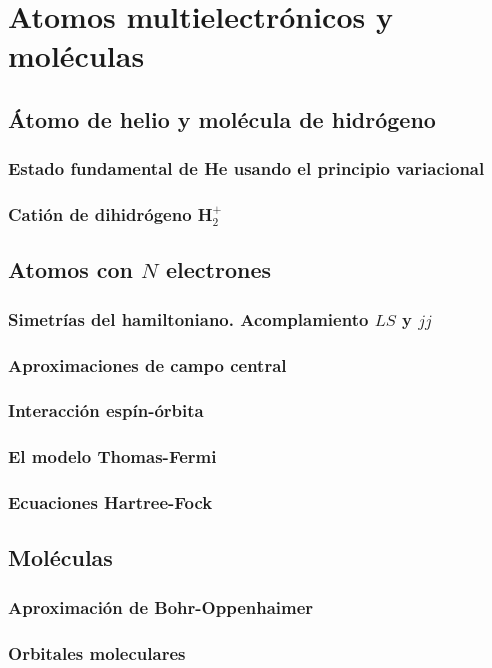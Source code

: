 \chapter{Atomos multielectrónicos y moléculas}

\section{Átomo de helio y molécula de hidrógeno}

\subsection{Estado fundamental de He usando el principio variacional}

\subsection{Catión de dihidrógeno H$_2^+$}

\section{Atomos con $N$ electrones}

\subsection{Simetrías del hamiltoniano. Acomplamiento $LS$ y $jj$}

\subsection{Aproximaciones de campo central}

\subsection{Interacción espín-órbita}

\subsection{El modelo Thomas-Fermi}

\subsection{Ecuaciones Hartree-Fock}

\section{Moléculas}

\subsection{Aproximación de Bohr-Oppenhaimer}

\subsection{Orbitales moleculares}




